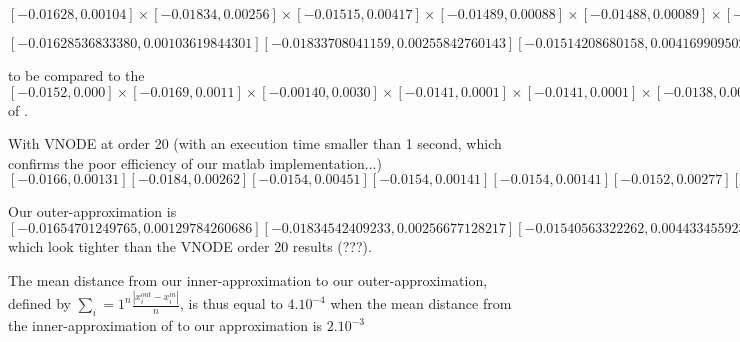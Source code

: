  $[   -0.01628,    0.00104]\times[   -0.01834,    0.00256]\times [   -0.01515,    0.00417]\times 
[   -0.01489,    0.00088] \times[   -0.01488,    0.00089]\times[   -0.0150,    0.00248]\times [   -0.01661,    0.00106]$

$[  -0.01628536833380,   0.00103619844301]  [  -0.01833708041159,   0.00255842760143]  [  -0.01514208680158,   0.00416990950253]  [  -0.01488096912574,   0.00087696255375] 
[  -0.01487744391170,   0.00088145048369]  [  -0.01492448895828,   0.00247920964913]  [  -0.01660493465136,   0.00105021396051] $

to be compared to the $[-0.0152,0.000]\times[-0.0169,0.0011]\times [-0.00140,0.0030]\times[-0.0141,0.0001]\times [-0.0141,0.0001]\times [-0.0138,0.0014]\times [-0.0155,0.0000]$
of \cite{underapprox16} .

With VNODE at order 20 (with an execution time smaller than 1 second, which confirms the poor efficiency of our matlab implementation...) 
$[-0.0166, 0.00131]
[-0.0184, 0.00262]
[-0.0154, 0.00451]
[-0.0154, 0.00141]
[-0.0154, 0.00141]
[-0.0152, 0.00277]
[-0.0169, 0.00131]$

Our outer-approximation is $ [  -0.01654701249765,   0.00129784260686]  [  -0.01834542409233,   0.00256677128217]  [  -0.01540563322262,   0.00443345592357]
[  -0.01539838418560,   0.00139437761361] [  -0.01538981256285,   0.00139381913484] [  -0.01519231394425,   0.00274703463510] [  -0.01686300688068,   0.00130828618983]$
which look tighter than the VNODE order 20 results (???). 

The mean distance from our inner-approximation to our outer-approximation, defined by $\sum_i=1^n \frac{|x_i^{out} - x_i^{in}|}{n}$, is thus equal to $4.10^{-4}$ 
when the mean distance from the inner-approximation of \cite{underapprox16} to our approximation is $2.10^{-3}$ 







